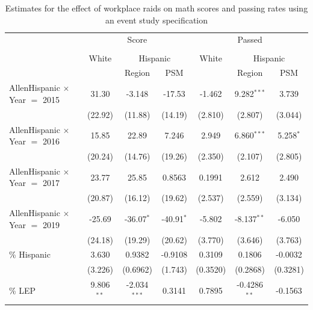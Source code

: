\documentclass[hidelinks,twoside]{article}
\begin{document}
\begin{table}
\centering
\caption{Estimates for the effect of workplace raids on math scores and passing rates using an event study specification}
\begin{tabular}{lcccccc}
   \tabularnewline \midrule \midrule
& \multicolumn{3}{c}{Score} & \multicolumn{3}{c}{Passed}\\
 \cline{2-7} \\
& White & \multicolumn{2}{c}{Hispanic} & White & \multicolumn{2}{c}{Hispanic} \\
    & & Region & PSM  & & Region & PSM \\ 
   \midrule
   AllenHispanic $\times$ Year $=$ 2015    & 31.30          & -3.148         & -17.53       & -1.462          & 9.282$^{***}$  & 3.739\\   
                                            & (22.92)        & (11.88)        & (14.19)      & (2.810)         & (2.807)        & (3.044)\\   
   AllenHispanic $\times$ Year $=$ 2016    & 15.85          & 22.89          & 7.246        & 2.949           & 6.860$^{***}$  & 5.258$^{*}$\\   
                                            & (20.24)        & (14.76)        & (19.26)      & (2.350)         & (2.107)        & (2.805)\\   
   AllenHispanic $\times$ Year $=$ 2017    & 23.77          & 25.85          & 0.8563       & 0.1991          & 2.612          & 2.490\\   
                                            & (20.87)        & (16.12)        & (19.62)      & (2.537)         & (2.559)        & (3.134)\\   
   AllenHispanic $\times$ Year $=$ 2019     & -25.69         & -36.07$^{*}$   & -40.91$^{*}$ & -5.802          & -8.137$^{**}$  & -6.050\\   
                                            & (24.18)        & (19.29)        & (20.62)      & (3.770)         & (3.646)        & (3.763)\\   
   \% Hispanic                        & 3.630          & 0.9382         & -0.9108      & 0.3109          & 0.1806         & -0.0032\\   
                                            & (3.226)        & (0.6962)       & (1.743)      & (0.3520)        & (0.2868)       & (0.3281)\\   
   \% LEP                            & 9.806$^{**}$   & -2.034$^{***}$ & 0.3141       & 0.7895          & -0.4286$^{**}$ & -0.1563\\   

\end{tabular}
\end{table}
\end{document}

